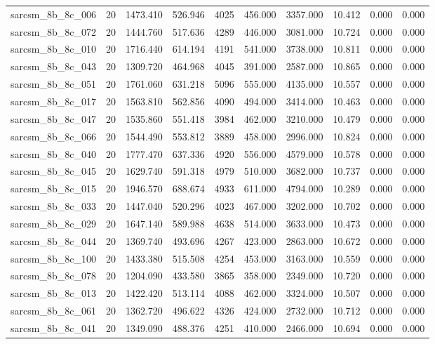 \begin{tabular}{lrrrrrrrrr}
sarcsm\_8b\_8c\_006 & 20 & 1473.410 & 526.946 & 4025 & 456.000 & 3357.000 & 10.412 & 0.000 & 0.000 \\
sarcsm\_8b\_8c\_072 & 20 & 1444.760 & 517.636 & 4289 & 446.000 & 3081.000 & 10.724 & 0.000 & 0.000 \\
sarcsm\_8b\_8c\_010 & 20 & 1716.440 & 614.194 & 4191 & 541.000 & 3738.000 & 10.811 & 0.000 & 0.000 \\
sarcsm\_8b\_8c\_043 & 20 & 1309.720 & 464.968 & 4045 & 391.000 & 2587.000 & 10.865 & 0.000 & 0.000 \\
sarcsm\_8b\_8c\_051 & 20 & 1761.060 & 631.218 & 5096 & 555.000 & 4135.000 & 10.557 & 0.000 & 0.000 \\
sarcsm\_8b\_8c\_017 & 20 & 1563.810 & 562.856 & 4090 & 494.000 & 3414.000 & 10.463 & 0.000 & 0.000 \\
sarcsm\_8b\_8c\_047 & 20 & 1535.860 & 551.418 & 3984 & 462.000 & 3210.000 & 10.479 & 0.000 & 0.000 \\
sarcsm\_8b\_8c\_066 & 20 & 1544.490 & 553.812 & 3889 & 458.000 & 2996.000 & 10.824 & 0.000 & 0.000 \\
sarcsm\_8b\_8c\_040 & 20 & 1777.470 & 637.336 & 4920 & 556.000 & 4579.000 & 10.578 & 0.000 & 0.000 \\
sarcsm\_8b\_8c\_045 & 20 & 1629.740 & 591.318 & 4979 & 510.000 & 3682.000 & 10.737 & 0.000 & 0.000 \\
sarcsm\_8b\_8c\_015 & 20 & 1946.570 & 688.674 & 4933 & 611.000 & 4794.000 & 10.289 & 0.000 & 0.000 \\
sarcsm\_8b\_8c\_033 & 20 & 1447.040 & 520.296 & 4023 & 467.000 & 3202.000 & 10.702 & 0.000 & 0.000 \\
sarcsm\_8b\_8c\_029 & 20 & 1647.140 & 589.988 & 4638 & 514.000 & 3633.000 & 10.473 & 0.000 & 0.000 \\
sarcsm\_8b\_8c\_044 & 20 & 1369.740 & 493.696 & 4267 & 423.000 & 2863.000 & 10.672 & 0.000 & 0.000 \\
sarcsm\_8b\_8c\_100 & 20 & 1433.380 & 515.508 & 4254 & 453.000 & 3163.000 & 10.559 & 0.000 & 0.000 \\
sarcsm\_8b\_8c\_078 & 20 & 1204.090 & 433.580 & 3865 & 358.000 & 2349.000 & 10.720 & 0.000 & 0.000 \\
sarcsm\_8b\_8c\_013 & 20 & 1422.420 & 513.114 & 4088 & 462.000 & 3324.000 & 10.507 & 0.000 & 0.000 \\
sarcsm\_8b\_8c\_061 & 20 & 1362.720 & 496.622 & 4326 & 424.000 & 2732.000 & 10.712 & 0.000 & 0.000 \\
sarcsm\_8b\_8c\_041 & 20 & 1349.090 & 488.376 & 4251 & 410.000 & 2466.000 & 10.694 & 0.000 & 0.000 \\

\end{tabular}
